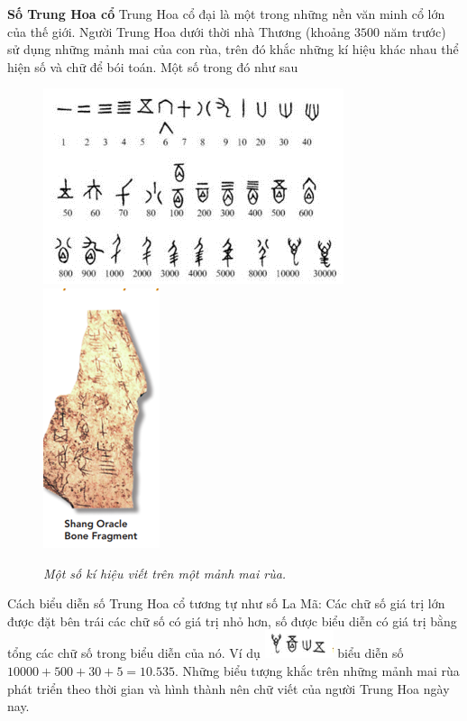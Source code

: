 	\vskip 0.1cm
	\textbf{Số Trung Hoa cổ}
	\vskip 0.1cm
	Trung Hoa cổ đại là một trong những nền văn minh cổ lớn của thế giới. Người Trung Hoa dưới thời nhà Thương (khoảng $3500$ năm trước) sử dụng những mảnh mai của con rùa, trên đó khắc những kí hiệu khác nhau thể hiện số và chữ để bói toán. Một số trong đó như sau
	\begin{figure}[H]
		\centering
		\vspace*{-5pt}
		\captionsetup{labelformat= empty, justification=centering}
		\includegraphics[height=0.4\linewidth]{40}\quad
		\includegraphics[height=0.4\linewidth]{41}
			\caption{\textit{\color{toancuabi}Một số kí hiệu viết trên một mảnh mai rùa.}}
		\vspace*{-10pt}
	\end{figure}
	Cách biểu diễn số Trung Hoa cổ tương tự như số La Mã: Các chữ số giá trị lớn được đặt bên trái các chữ số có  giá trị nhỏ hơn, số được biểu diễn có giá trị bằng tổng các chữ số trong biểu diễn của nó. Ví dụ \includegraphics{42} biểu diễn số $10000 + 500 + 30 + 5 =10{.}535$. Những biểu tượng khắc trên những mảnh mai rùa phát triển theo thời gian và hình thành nên chữ viết của người Trung Hoa ngày nay. 
	\vskip 0.1cm
